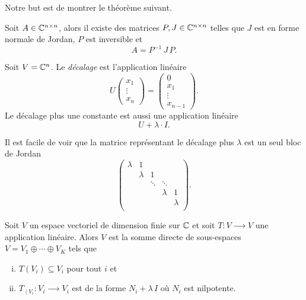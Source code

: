 Notre but est de montrer le théorème suivant. 

\begin{theorem}
  \label{thr:41}
  Soit $A \in \mathbb{C}^{n \times n}$, alors il existe des matrices $P,J \in \mathbb{C}^{n \times n}$ telles que $J$ est en forme normale de Jordan, $P$ est inversible et 
  \begin{displaymath}
    A = P^{-1} \,J \,P. 
  \end{displaymath}
\end{theorem}

\begin{definition}
  \label{def:36}
  Soit $V  = \mathbb{C}^n$. Le \emph{décalage}  est l'application linéaire 
  \begin{displaymath}
    U
    \begin{pmatrix}
      x_1 \\ \vdots \\ x_n
    \end{pmatrix}
     = 
     \begin{pmatrix}
       0 \\ x_1 \\ \vdots \\ x_{n-1}
     \end{pmatrix}. 
  \end{displaymath}
  Le décalage plus une constante est aussi une application linéaire 
  \begin{displaymath}
    U + \lambda \cdot I. 
  \end{displaymath}
\end{definition}

Il est facile de voir que la matrice représentant le décalage plus $λ$ est 
un seul bloc de Jordan 
\begin{displaymath}
 \begin{pmatrix}
      λ & 1 \\
        & λ & 1 \\
        &   & \ddots & \ddots \\ 
        &   &             & λ & 1 \\
        &   &         &  & λ  \\
    \end{pmatrix}.   
\end{displaymath}



\begin{lemma}
  \label{lem:19}
  Soit $V$ un espace vectoriel de dimension finie sur $\mathbb{C}$ et soit $T\colon V ⟶ V$ une application linéaire. Alors $V$ est la somme directe de sous-espaces   $V = V_1 ⊕ \cdots ⊕ V_K$  tels que 
  \begin{enumerate}[i)]
  \item $T(V_i) ⊆ V_i$ pour tout $i$ et \label{item:10}
  \item $T_{∣V_i} \colon V_i ⟶ V_i$
    est de la forme $N_i + λ \, I$ où $N_i$ est nilpotente. \label{item:11}
  \end{enumerate}
\end{lemma}

